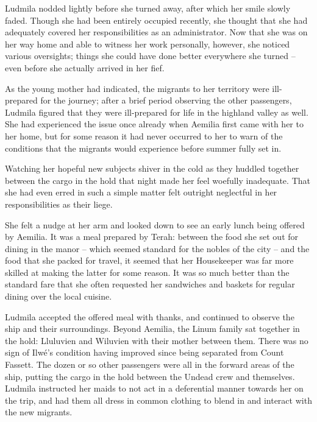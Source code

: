 Ludmila nodded lightly before she turned away, after which her smile slowly faded. Though she had been entirely occupied recently, she thought that she had adequately covered her responsibilities as an administrator. Now that she was on her way home and able to witness her work personally, however, she noticed various oversights; things she could have done better everywhere she turned – even before she actually arrived in her fief.

 

As the young mother had indicated, the migrants to her territory were ill-prepared for the journey; after a brief period observing the other passengers, Ludmila figured that they were ill-prepared for life in the highland valley as well. She had experienced the issue once already when Aemilia first came with her to her home, but for some reason it had never occurred to her to warn of the conditions that the migrants would experience before summer fully set in.

 

Watching her hopeful new subjects shiver in the cold as they huddled together between the cargo in the hold that night made her feel woefully inadequate. That she had even erred in such a simple matter felt outright neglectful in her responsibilities as their liege.

 

She felt a nudge at her arm and looked down to see an early lunch being offered by Aemilia. It was a meal prepared by Terah: between the food she set out for dining in the manor – which seemed standard for the nobles of the city – and the food that she packed for travel, it seemed that her Housekeeper was far more skilled at making the latter for some reason. It was so much better than the standard fare that she often requested her sandwiches and baskets for regular dining over the local cuisine.

 

Ludmila accepted the offered meal with thanks, and continued to observe the ship and their surroundings. Beyond Aemilia, the Linum family sat together in the hold: Lluluvien and Wiluvien with their mother between them. There was no sign of Ilwé’s condition having improved since being separated from Count Fassett. The dozen or so other passengers were all in the forward areas of the ship, putting the cargo in the hold between the Undead crew and themselves. Ludmila instructed her maids to not act in a deferential manner towards her on the trip, and had them all dress in common clothing to blend in and interact with the new migrants.

